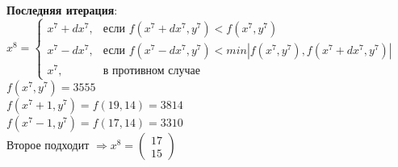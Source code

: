 \textbf{Последняя итерация}:\\
$
x^{8} = 
\begin{cases}
x^{7} + dx^{7},&\text{если $f(x^{7} + dx^{7}, y^{7}) < f(x^{7}, y^{7})$}\\
x^{7} - dx^{7},&\text{если $f(x^{7} - dx^{7}, y^{7}) < min|f(x^{7}, y^{7}), f(x^{7} + dx^{7}, y^{7})|$}\\
x^{7},&\text{в противном случае}
\end{cases}
$\\
$f(x^{7}, y^{7}) = 3555$\\
$f(x^{7} + 1, y^{7}) = f(19, 14) = 3814 $\\
$f(x^{7} - 1, y^{7}) = f(17, 14) = 3310 $\\
Второе подходит $\Rightarrow x^{8} = 
\begin{pmatrix}
  17\\
  15
\end{pmatrix}
$

\pagebreak
